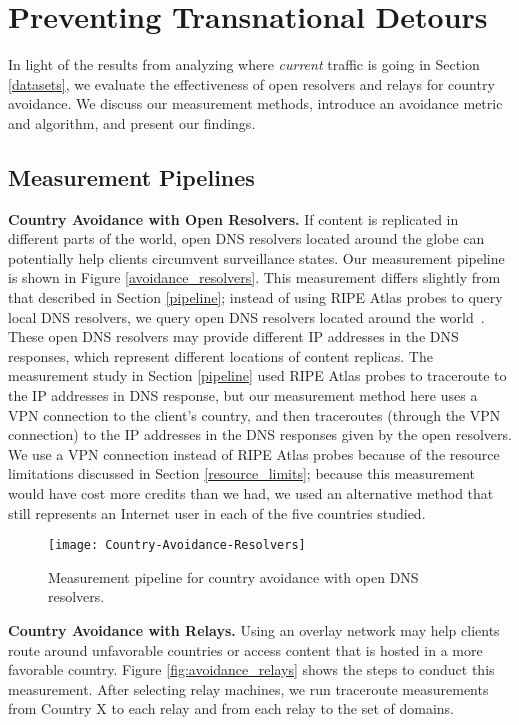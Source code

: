 \section{Preventing Transnational Detours}
\label{avoid_results}
In light of the results from analyzing where \textit{current} traffic is going in Section \ref{datasets}, we evaluate the effectiveness of open resolvers and relays for country avoidance.  We discuss our measurement methods, introduce an avoidance metric and algorithm, and present our findings.

\subsection{Measurement Pipelines}

{\bf Country Avoidance with Open Resolvers.} If content is replicated in different parts of the world, open DNS resolvers located around the globe can potentially help clients circumvent surveillance states.  Our measurement pipeline is shown in Figure \ref{avoidance_resolvers}.  This measurement differs slightly from that described in Section \ref{pipeline}; instead of using RIPE Atlas probes to query local DNS resolvers, we query open DNS resolvers located around the world~\cite{open_resolver_list}.  These open DNS resolvers may provide different IP addresses in the DNS responses, which represent different locations of content replicas. The measurement study in Section \ref{pipeline} used RIPE Atlas probes to traceroute to the IP addresses in DNS response, but our measurement method here uses a VPN connection to the client's country, and then traceroutes (through the VPN connection) to the IP addresses in the DNS responses given by the open resolvers.  We use a VPN connection instead of RIPE Atlas probes because of the resource limitations discussed in Section \ref{resource_limits}; because this measurement would have cost more credits than we had, we used an alternative method that still represents an Internet user in each of the five countries studied.

\begin{figure}[t]
\centering
\texttt{[image: Country-Avoidance-Resolvers]}
\caption{Measurement pipeline for country avoidance with open DNS resolvers.}
\label{fig:avoidance_resolvers}
\end{figure}

{\bf Country Avoidance with Relays.} Using an overlay network may help clients route around unfavorable countries or access content that is hosted in a more favorable country.  Figure \ref{fig:avoidance_relays} shows the steps to conduct this measurement.  After selecting relay machines, we run traceroute measurements from Country X to each relay and from each relay to the set of domains. 

